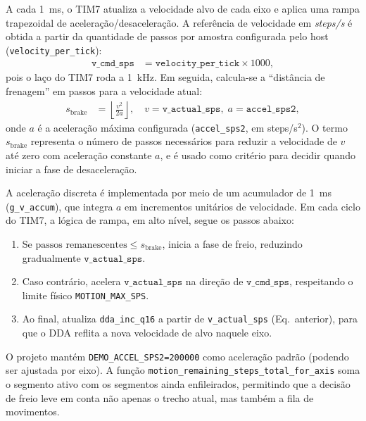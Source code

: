 A cada \SI{1}{ms}, o TIM7 atualiza a velocidade alvo de cada eixo e aplica
uma rampa trapezoidal de acelera\c{c}\~ao/desacelera\c{c}\~ao. A refer\^encia de
velocidade em \emph{steps/s} \'e obtida a partir da quantidade de passos por
amostra configurada pelo host (\texttt{velocity\_per\_tick}):
\begin{align*}
  \texttt{v\_cmd\_sps} &= \texttt{velocity\_per\_tick}\times 1000,
\end{align*}
pois o la\c{c}o do TIM7 roda a \SI{1}{kHz}. Em seguida, calcula-se a
``dist\^ancia de frenagem'' em passos para a velocidade atual:
\begin{align*}
  s_{\text{brake}} &= \left\lfloor \frac{v^2}{2a} \right\rfloor,
  \quad v=\texttt{v\_actual\_sps},\; a=\texttt{accel\_sps2},
\end{align*}
onde $a$ \'e a acelera\c{c}\~ao m\'axima configurada (\texttt{accel\_sps2}, em
steps/s$^2$). O termo $s_{\text{brake}}$ representa o n\'umero de passos
necess\'arios para reduzir a velocidade de $v$ at\'e zero com acelera\c{c}\~ao
constante $a$, e \'e usado como crit\'erio para decidir quando iniciar a
fase de desacelera\c{c}\~ao.

A acelera\c{c}\~ao discreta \'e implementada por meio de um acumulador de
\SI{1}{ms} (\texttt{g\_v\_accum}), que integra $a$ em incrementos unit\'arios
de velocidade. Em cada ciclo do TIM7, a l\'ogica de rampa, em alto n\'ivel,
segue os passos abaixo:
\begin{enumerate}
  \item Se $\text{passos remanescentes} \le s_{\text{brake}}$, inicia a
        fase de freio, reduzindo gradualmente $\texttt{v\_actual\_sps}$.
  \item Caso contr\'ario, acelera $\texttt{v\_actual\_sps}$ na dire\c{c}\~ao de
        $\texttt{v\_cmd\_sps}$, respeitando o limite f\'isico
        \texttt{MOTION\_MAX\_SPS}.
  \item Ao final, atualiza \texttt{dda\_inc\_q16} a partir de
        \texttt{v\_actual\_sps} (Eq.~anterior), para que o DDA reflita a nova
        velocidade de alvo naquele eixo.
\end{enumerate}
O projeto mant\'em \texttt{DEMO\_ACCEL\_SPS2=\num{200000}} como acelera\c{c}\~ao
padr\~ao (podendo ser ajustada por eixo). A fun\c{c}\~ao
\texttt{motion\_remaining\_steps\_total\_for\_axis} soma o segmento ativo com
os segmentos ainda enfileirados, permitindo que a decis\~ao de freio leve em
conta n\~ao apenas o trecho atual, mas tamb\'em a fila de movimentos.

